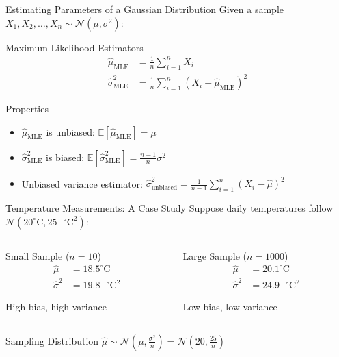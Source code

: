 \documentclass{beamer}
\begin{document}
\begin{frame}{Estimating Parameters of a Gaussian Distribution}
  Given a sample $X_1, X_2, \ldots, X_n \sim \mathcal{N}(\mu, \sigma^2)$:
  
  \begin{block}{Maximum Likelihood Estimators}
    \begin{align*}
    \hat{\mu}_{\text{MLE}} &= \frac{1}{n} \sum_{i=1}^n X_i \\
    \hat{\sigma}^2_{\text{MLE}} &= \frac{1}{n} \sum_{i=1}^n (X_i - \hat{\mu}_{\text{MLE}})^2
    \end{align*}
  \end{block}
  
  \begin{block}{Properties}
    \begin{itemize}
      \item $\hat{\mu}_{\text{MLE}}$ is unbiased: $\mathbb{E}[\hat{\mu}_{\text{MLE}}] = \mu$
      \item $\hat{\sigma}^2_{\text{MLE}}$ is biased: $\mathbb{E}[\hat{\sigma}^2_{\text{MLE}}] = \frac{n-1}{n} \sigma^2$
      \item Unbiased variance estimator: $\hat{\sigma}^2_{\text{unbiased}} = \frac{1}{n-1} \sum_{i=1}^n (X_i - \hat{\mu})^2$
    \end{itemize}
  \end{block}
\end{frame}

\begin{frame}{Temperature Measurements: A Case Study}
  Suppose daily temperatures follow $\mathcal{N}(20^\circ\text{C}, 25\text{ }^\circ\text{C}^2)$:
  
  \begin{columns}
    \begin{column}{0.5\textwidth}
      \begin{block}{Small Sample ($n=10$)}
        \begin{align*}
        \hat{\mu} &= 18.5^\circ\text{C} \\
        \hat{\sigma}^2 &= 19.8\text{ }^\circ\text{C}^2
        \end{align*}
        \centerline{High bias, high variance}
      \end{block}
    \end{column}
    \begin{column}{0.5\textwidth}
      \begin{block}{Large Sample ($n=1000$)}
        \begin{align*}
        \hat{\mu} &= 20.1^\circ\text{C} \\
        \hat{\sigma}^2 &= 24.9\text{ }^\circ\text{C}^2
        \end{align*}
        \centerline{Low bias, low variance}
      \end{block}
    \end{column}
  \end{columns}
  
  \begin{block}{Sampling Distribution}
    $\hat{\mu} \sim \mathcal{N}\left(\mu, \frac{\sigma^2}{n}\right) = \mathcal{N}\left(20, \frac{25}{n}\right)$
  \end{block}
\end{frame}
\end{document}
